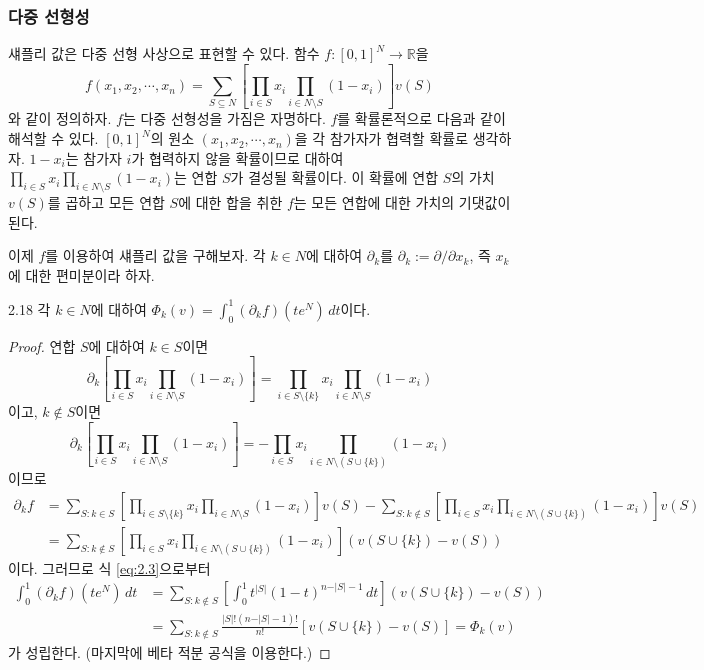 \documentclass{article}
\numberwithin{equation}{section}
\begin{document}
\subsubsection*{다중 선형성}
섀플리 값은 다중 선형 사상으로 표현할 수 있다. 함수 $f:[0,1]^N\to\mathbb R$을
\[
	f(x_1,x_2,\cdots,x_n)=\sum_{S\subseteq N}\left[\prod_{i\in S}x_i\prod_{i\in N\setminus S}(1-x_i)\right]v(S)
\]
와 같이 정의하자. $f$는 다중 선형성을 가짐은 자명하다. $f$를 확률론적으로 다음과 같이 해석할 수 있다. $[0,1]^N$의 원소 $(x_1,x_2,\cdots,x_n)$을 각 참가자가 협력할 확률로 생각하자. $1-x_i$는 참가자 $i$가 협력하지 않을 확률이므로 대하여 $\prod_{i\in S}x_i\prod_{i\in N\setminus S}(1-x_i)$는 연합 $S$가 결성될 확률이다. 이 확률에 연합 $S$의 가치 $v(S)$를 곱하고 모든 연합 $S$에 대한 합을 취한 $f$는 모든 연합에 대한 가치의 기댓값이 된다.

\newpage
이제 $f$를 이용하여 섀플리 값을 구해보자. 각 $k\in N$에 대하여 $\partial_k$를 $\partial_k:=\partial/\partial x_k$, 즉 $x_k$에 대한 편미분이라 하자.

\begin{thm}{}{2.18}
	각 $k\in N$에 대하여 $\Phi_k(v)=\displaystyle\int_0^1(\partial_kf)(te^N)\,dt$이다.
\end{thm}

\begin{proof}
	연합 $S$에 대하여 $k\in S$이면
	\[
		\partial_k\left[\prod_{i\in S}x_i\prod_{i\in N\setminus S}(1-x_i)\right]=\prod_{i\in S\setminus\{k\}}x_i\prod_{i\in N\setminus S}(1-x_i)
	\]
	이고, $k\notin S$이면
	\[
		\partial_k\left[\prod_{i\in S}x_i\prod_{i\in N\setminus S}(1-x_i)\right]=-\prod_{i\in S}x_i\prod_{i\in N\setminus(S\cup\{k\})}(1-x_i)
	\]
	이므로
	\[
		\begin{aligned}
			\partial_kf&=\sum_{S:k\in S}\left[\prod_{i\in S\setminus\{k\}}x_i\prod_{i\in N\setminus S}(1-x_i)\right]v(S)-\sum_{S:k\notin S}\left[\prod_{i\in S}x_i\prod_{i\in N\setminus(S\cup\{k\})}(1-x_i)\right]v(S)\\
			&=\sum_{S:k\notin S}\left[\prod_{i\in S}x_i\prod_{i\in N\setminus(S\cup\{k\})}(1-x_i)\right](v(S\cup\{k\})-v(S))
		\end{aligned}
	\]
	이다. 그러므로 식 \ref{eq:2.3}으로부터
	\[
		\begin{aligned}
			\int_0^1(\partial_kf)(te^N)\,dt&=\sum_{S:k\notin S}\left[\int_0^1t^{\vert S\vert}(1-t)^{n-\vert S\vert-1}\,dt\right](v(S\cup\{k\})-v(S))\\
			&=\sum_{S:k\notin S}\frac{\vert S\vert!(n-\vert S\vert-1)!}{n!}[v(S\cup\{k\})-v(S)]=\Phi_k(v)
		\end{aligned}
	\]
	가 성립한다. (마지막에 베타 적분 공식을 이용한다.)
\end{proof}
\end{document}
